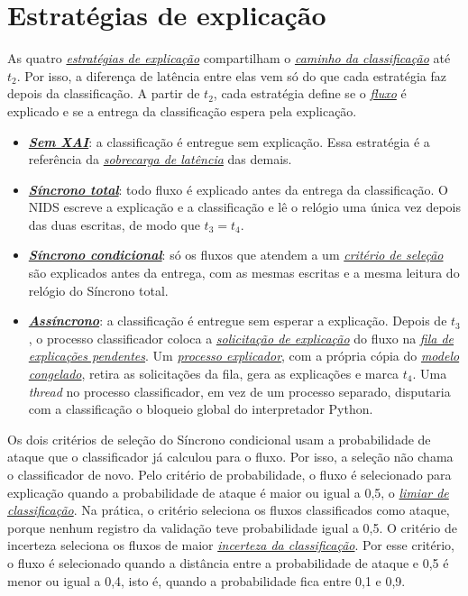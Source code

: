 \documentclass[
  12pt,
  oneside,
  a4paper,
  chapter=TITLE,
  sumario=tradicional,
  english,
  brazil
]{abntex2}
\newcommand{\termo}[2]{\hyperref[gl:#1]{\emph{#2}}}
\begin{document}
\section{Estratégias de explicação}
\label{sec:estrategias}

As quatro \termo{estrategia}{estratégias de explicação} compartilham o
\termo{caminho}{caminho da classificação} até $t_2$. Por isso, a diferença de latência entre elas
vem só do que cada estratégia faz depois da classificação. A partir de $t_2$, cada estratégia define
se o \termo{fluxo}{fluxo} é explicado e se a entrega da classificação espera pela explicação.
\begin{itemize}
  \item \textbf{\termo{sem-xai}{Sem XAI}}: a classificação é entregue sem explicação. Essa
  estratégia é a referência da \termo{sobrecarga}{sobrecarga de latência} das demais.
  \item \textbf{\termo{sincrono-total}{Síncrono total}}: todo fluxo é explicado antes da entrega
  da classificação. O NIDS escreve a explicação e a classificação e lê o relógio uma única vez
  depois das duas escritas, de modo que $t_3 = t_4$.
  \item \textbf{\termo{sincrono-condicional}{Síncrono condicional}}: só os fluxos que atendem a um
  \termo{criterio-selecao}{critério de seleção} são explicados antes da entrega, com as mesmas
  escritas e a mesma leitura do relógio do Síncrono total.
  \item \textbf{\termo{assincrono}{Assíncrono}}: a classificação é entregue sem esperar a
  explicação. Depois de $t_3$, o processo classificador coloca a
  \termo{solicitacao}{solicitação de explicação} do fluxo na
  \termo{fila-explicacoes}{fila de explicações pendentes}. Um
  \termo{processo-explicador}{processo explicador}, com a própria cópia do
  \termo{modelo-congelado}{modelo congelado}, retira as solicitações da fila, gera as explicações e
  marca $t_4$. Uma \emph{thread} no processo classificador, em vez de um processo separado,
  disputaria com a classificação o bloqueio global do interpretador Python.
\end{itemize}

Os dois critérios de seleção do Síncrono condicional usam a probabilidade de ataque que o
classificador já calculou para o fluxo. Por isso, a seleção não chama o classificador de novo. Pelo
critério de probabilidade, o fluxo é selecionado para explicação quando a probabilidade de ataque é
maior ou igual a 0,5, o \termo{limiar-classificacao}{limiar de classificação}. Na prática, o
critério seleciona os fluxos classificados como ataque, porque nenhum registro da validação teve
probabilidade igual a 0,5. O critério de incerteza seleciona os
fluxos de maior \termo{incerteza}{incerteza da classificação}. Por esse critério, o fluxo é
selecionado quando a distância entre a probabilidade de ataque e 0,5 é menor ou igual a 0,4, isto
é, quando a probabilidade fica entre 0,1 e 0,9.
\end{document}
